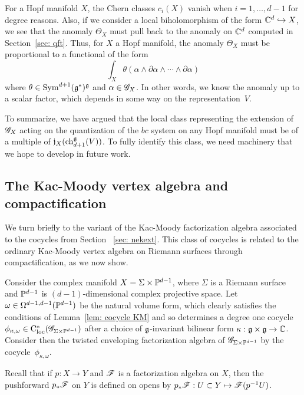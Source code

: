 For a Hopf manifold $X$, the Chern classes $c_i(X)$ vanish when $i=1,\ldots,d-1$ for degree reasons. 
Also, if we consider a local biholomorphism of the form $\mathbb C^d \hookrightarrow X$, we see that the anomaly $\Theta_X$ must pull back to the anomaly on $\mathbb C^d$ computed in Section~\ref{sec: qft}. 
Thus, for $X$ a Hopf manifold, the anomaly $\Theta_X$ must be proportional to a functional of the form
\[
\int_X \theta(\alpha \wedge \partial \alpha \wedge \cdots \wedge \partial \alpha)
\]
where $\theta \in {\rm Sym}^{d+1}(\mathfrak g^*)^\mathfrak g$ and $\alpha \in \mathscr G_X$. 
In other words, we know the anomaly up to a scalar factor, which depends in some way on the representation~$V$.

To summarize, we have argued that the local class representing the extension of $\mathscr G_X$ acting on the quantization of the $bc$ system on any Hopf manifold must be of a multiple of $\mathfrak j_X({\rm ch}_{d+1}^\mathfrak g(V))$. 
To fully identify this class, we need machinery that we hope to develop in future work. 

\subsection{The Kac-Moody vertex algebra and compactification} 

We turn briefly to the variant of the Kac-Moody factorization algebra associated to the cocycles from Section ~\ref{sec: nekext}.
This class of cocycles is related to the ordinary Kac-Moody vertex algebra on Riemann surfaces through compactification, as we now show. 

Consider the complex manifold $X = \Sigma \times \mathbb P^{d-1}$, 
where $\Sigma$ is a Riemann surface and $\mathbb P^{d-1}$ is $(d-1)$-dimensional complex projective space.
Let $\omega \in \Omega^{d-1,d-1}(\mathbb P^{d-1})$ be the natural volume form, 
which clearly satisfies the conditions of Lemma~\ref{lem: cocycle KM} and so determines a degree one cocycle $\phi_{\kappa, \omega} \in {\rm C}_{\rm loc}^*(\mathscr G_{\Sigma \times \mathbb P^{d-1}})$ after a choice of $\mathfrak g$-invariant bilinear form $\kappa : \mathfrak g \times \mathfrak g \to \mathbb C$. 
Consider then the twisted enveloping factorization algebra of $\mathscr G_{\Sigma \times \mathbb P^{d-1}}$ by the cocycle~$\phi_{\kappa, \omega}$. 

Recall that if $p : X \to Y$ and $\mathscr F$ is a factorization algebra on $X$, then the pushforward $p_* \mathscr F$ on $Y$ is defined on opens by $p_* \mathscr F : U \subset Y \mapsto \mathscr F(p^{-1} U)$. 

